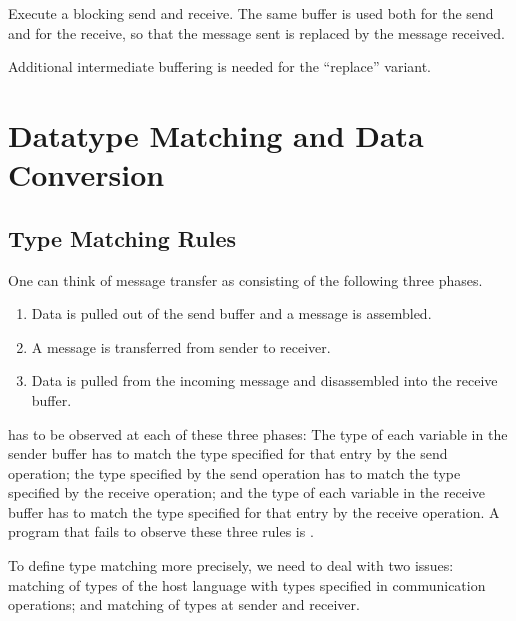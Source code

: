 Execute a blocking send and receive. The same buffer is used both for
the send and for the receive, so that the message sent is replaced by
the message received.

\begin{implementors}
Additional intermediate buffering is needed for the
``replace'' variant.
\end{implementors}

\section{Datatype Matching and Data Conversion}
\label{sec:pt2pt-typematch}

\subsection{Type Matching Rules}
\label{subsec:pt2pt-typematch}

One can think of message transfer as consisting of the following three phases.
\begin{enumerate}
\item
Data is pulled out of the send buffer and a message is assembled.
\item
A message is transferred from sender to receiver.
\item
Data is pulled from the incoming message and disassembled into the receive
buffer.
\end{enumerate}

 has to be observed at each of these three phases: The type
of each variable in the sender buffer has to match
the type specified for that entry by the send operation;
the type specified by the send operation has to match the type specified by
the receive operation; and
the type of each
variable in the receive buffer has to match the type specified for
that entry by the receive operation.
A program that fails to observe these
three rules is .

To define type matching more precisely, we need to deal with two issues:
matching of types of the host language with types specified in
communication operations;
and matching of types at sender and receiver.

